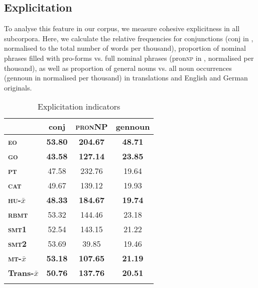 \documentclass[output=paper]{LSP/langsci}
\begin{document}
\subsection{Explicitation}

To analyse this feature in our corpus, we measure cohesive explicitness in all subcorpora. Here, we calculate the relative frequencies for conjunctions (conj in , normalised to the total number of words per thousand), proportion of nominal phrases filled with pro-forms vs. full nominal phrases (pron\textsc{np} in , normalised per thousand), as well as proportion of general nouns vs. all noun occurrences (gennoun in  normalised per thousand) in translations and English and German originals.

\begin{table}
     \centering
     \begin{tabular}{lccc}
\lsptoprule
              & \textbf{conj}         & \textbf{\textsc{pronNP}}  & \textbf{gennoun} \\ \midrule
\textbf{\textsc{eo}}    & \textbf{53.80}     & \textbf{204.67} & \textbf{48.71} \\ 
\textbf{\textsc{go}}    & \textbf{43.58}     & \textbf{127.14} & \textbf{23.85} \\ 
\textbf{\textsc{pt}}    & 47.58		        & 232.76          & 19.64 \\
\textbf{\textsc{cat}}   & 49.67		        & 139.12          & 19.93  \\ 
\textbf{\textsc{hu}-$\bar{x}$}    & \textbf{48.33}     & \textbf{184.67}   & \textbf{19.74}\\ 
\textbf{\textsc{rbmt}}  & 53.32		        & 144.46          & 23.18 \\
\textbf{\textsc{smt}1}  & 52.54		        & 143.15          & 21.22 \\
\textbf{\textsc{smt}2}  & 53.69		        & 39.85           & 19.46 \\ 
\textbf{\textsc{mt}-$\bar{x}$} & \textbf{53.18}  & \textbf{107.65}  & \textbf{21.19} \\ 
\textbf{Trans-$\bar{x}$} & \textbf{50.76}  & \textbf{137.76}  & \textbf{20.51} \\ 
\lspbottomrule
     \end{tabular}

 \caption{Explicitation indicators}
     \label{tab:4.3}
\end{table}
\end{document}
